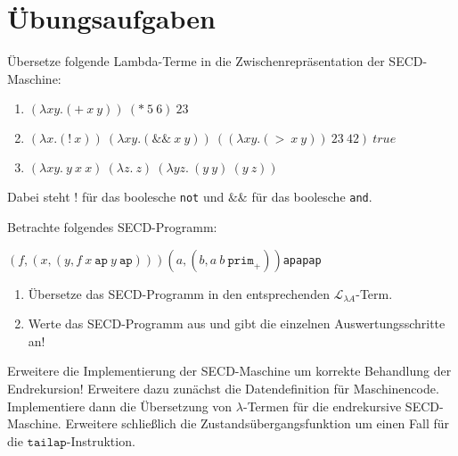 \section*{Übungsaufgaben}

\begin{aufgabe}
  Übersetze folgende Lambda-Terme in die Zwischenrepräsentation
  der SECD-Maschine:
  
  \begin{enumerate}
  \item \((\lambda xy.(+\:x\:y))\:(*\:5\:6)\:23\)

  \item \((\lambda x.(!\:x))\:(\lambda xy.(\&\&\:x\:y))\:((\lambda xy.(>\:x\:y))\:23~42)\:true\)

   
  \item \((\lambda xy.\:y\:x\:x)\:(\lambda z.\:z)\:(\lambda yz.\:(y\:y)\:(y\:z))\)

  \end{enumerate}

  Dabei steht $!$ für das boolesche \lstinline{not} und $\&\&$ für das
  boolesche \lstinline{and}.
\end{aufgabe}

\begin{aufgabe}
 Betrachte folgendes SECD-Programm:
 
 \newcommand{\tuple}[2]{\ensuremath{(#1,#2)}}

 \begin{center}
   \tuple{f}{\tuple{x}{\tuple{y}{f\:x\:\texttt{ap}\:y\:\texttt{ap}}}}\:\tuple{a}{\tuple{b}{a\:b\:\texttt{prim}_+}}\:\texttt{ap}\:\texttt{ap}\:\texttt{ap}
 \end{center}
 
 \begin{enumerate}
   \item Übersetze das SECD-Programm in den entsprechenden
   $\mathcal{L}_{\lambda{}A}$-Term.
   \item Werte das SECD-Programm aus und gibt die einzelnen
     Auswertungsschritte an!
 \end{enumerate}
  
\end{aufgabe}

\begin{aufgabe}\label{aufgabe:secd-endekursiv-implementieren}
  Erweitere die Implementierung der SECD-Maschine um korrekte
  Behandlung der Endrekursion!  Erweitere dazu zunächst die
  Datendefinition für Maschinencode. Implementiere dann die
  Übersetzung von $\lambda$-Termen für die endrekursive SECD-Maschine.
  Erweitere schließlich die Zustandsübergangsfunktion um einen
  Fall für die $\mathtt{tailap}$-Instruktion.
\end{aufgabe}


